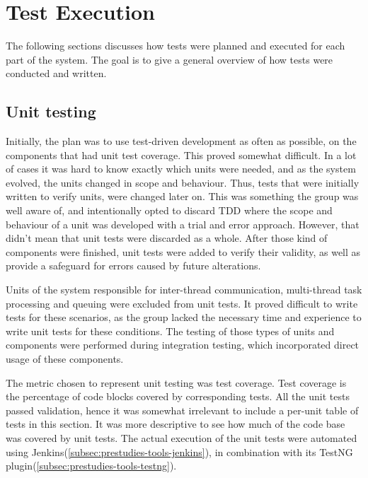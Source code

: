 \section{Test Execution}
\label{subsec:testing-test_execution}

The following sections discusses how tests were planned and executed for each part of the system. The goal is to give a general overview of how tests were conducted and written.

\subsection{Unit testing}
\label{subsec:testing-test_execution-unit_testing}

Initially, the plan was to use test-driven development as often as possible, on the components that had unit test coverage. This proved somewhat difficult. In a lot of cases it was hard to know exactly which units were needed, and as the system evolved, the units changed in scope and behaviour. Thus, tests that were initially written to verify units, were changed later on. This was something the group was well aware of, and intentionally opted to discard TDD where the scope and behaviour of a unit was developed with a trial and error approach. However, that didn't mean that unit tests were discarded as a whole. After those kind of components were finished, unit tests were added to verify their validity, as well as provide a safeguard for errors caused by future alterations.

Units of the system responsible for inter-thread communication, multi-thread task processing and queuing were excluded from unit tests. It proved difficult to write tests for these scenarios, as the group lacked the necessary time and experience to write unit tests for these conditions. The testing of those types of units and components were performed during integration testing, which incorporated direct usage of these components.

The metric chosen to represent unit testing was test coverage. Test coverage is the percentage of code blocks covered by corresponding tests. All the unit tests passed validation, hence it was somewhat irrelevant to include a per-unit table of tests in this section. It was more descriptive to see how much of the code base was covered by unit tests. The actual execution of the unit tests were automated using Jenkins(\ref{subsec:prestudies-tools-jenkins}), in combination with its TestNG plugin(\ref{subsec:prestudies-tools-testng}).

